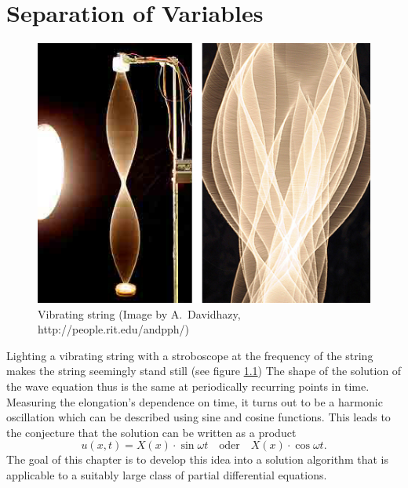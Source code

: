 %
%
%
\rhead{}
\chapter{Separation of Variables\label{chapter-separation}}
\begin{figure}
\begin{center}
\includegraphics[width=0.8\hsize]{../common/graphics/stringvibrlarge-10-06-06.jpg}
\end{center}
\caption{
Vibrating string
(Image by A.~Davidhazy, http://people.rit.edu/andpph/)
\label{separation:schwingendesaite}}
\end{figure}
Lighting a vibrating string with a stroboscope at the frequency of the
string makes the string seemingly stand still (see figure
\ref{separation:schwingendesaite})
The shape of the solution of the wave equation thus is the same
at periodically recurring points in time.
Measuring the elongation's dependence on time, it turns out to be
a harmonic oscillation which can be described using sine and cosine
functions.
This leads to the conjecture that the solution can be written as 
a product
\[
u(x,t)=X(x)\cdot\sin\omega t\quad\text{oder}\quad X(x)\cdot\cos\omega t.
\]
The goal of this chapter is to develop this idea into a solution
algorithm that is applicable to a suitably large class of partial
differential equations.









